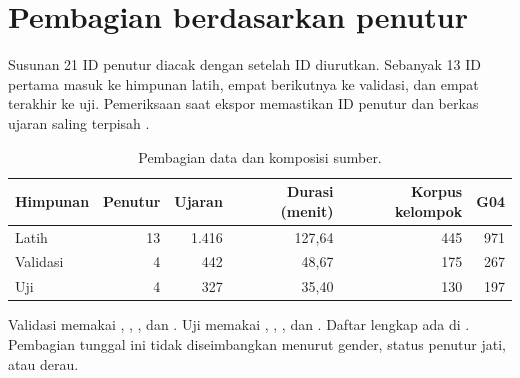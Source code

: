 \section{Pembagian berdasarkan penutur}

Susunan 21 ID penutur diacak dengan  setelah ID diurutkan. Sebanyak 13 ID pertama masuk ke himpunan latih, empat berikutnya ke validasi, dan empat terakhir ke uji. Pemeriksaan saat ekspor memastikan ID penutur dan berkas ujaran saling terpisah \cite{repoasr}.

\begin{table}[!htbp]
  \centering\small
  \caption{Pembagian data dan komposisi sumber.}
  \label{tab:split}
  \begin{tabular}{@{}lrrrrr@{}}
    \toprule
    Himpunan & Penutur & Ujaran & Durasi (menit) & Korpus kelompok & G04 \\
    \midrule
    Latih & 13 & 1.416 & 127,64 & 445 & 971 \\
    Validasi & 4 & 442 & 48,67 & 175 & 267 \\
    Uji & 4 & 327 & 35,40 & 130 & 197 \\
    \bottomrule
  \end{tabular}
\end{table}

Validasi memakai , , , dan . Uji memakai , , , dan . Daftar lengkap ada di . Pembagian tunggal ini tidak diseimbangkan menurut gender, status penutur jati, atau derau.
